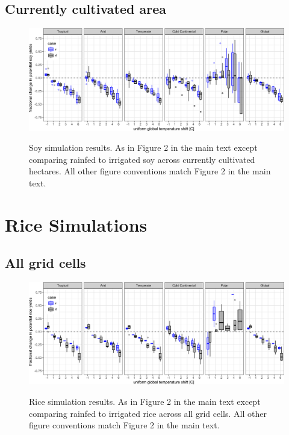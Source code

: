 \documentclass[10pt]{article}
\begin{document}
\subsection{Currently cultivated area}
\begin{figure}[h!]
\includegraphics[width=\textwidth]{s_soy_sim_CG_area_weight.png}\\
\caption{Soy simulation results. As in Figure 2 in the main text except comparing rainfed to irrigated soy across currently cultivated hectares. All other figure conventions match Figure 2 in the main text.}
\label{fig:maizeCG}
\end{figure}

\clearpage
\section{Rice Simulations}
\subsection{All grid cells}
\begin{figure}[h!]
\includegraphics[width=\textwidth]{s_rice_sim_CG.png}\\
\caption{Rice simulation results. As in Figure 2 in the main text except comparing rainfed to irrigated rice across all grid cells. All other figure conventions match Figure 2 in the main text.}
\label{fig:maizeCG}
\end{figure}
\end{document}
